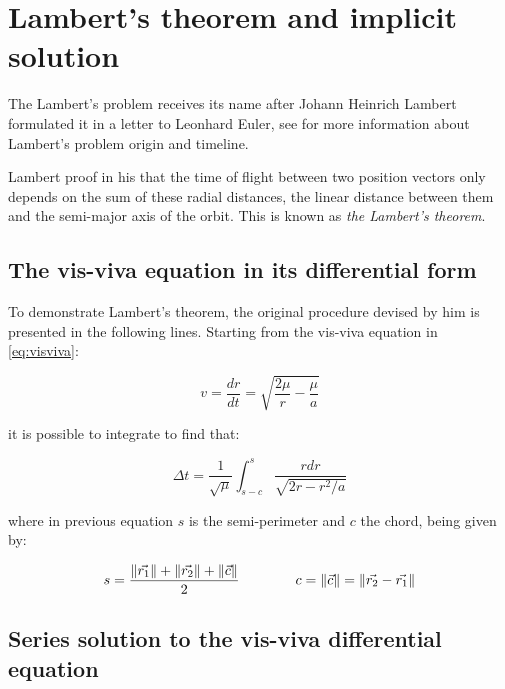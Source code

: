 \section{Lambert's theorem and implicit solution}
\label{sec:lamberts_theorem}

The Lambert's problem receives its name after Johann Heinrich Lambert formulated
it in a letter to Leonhard Euler, see \cite{albouy2019} for more information
about Lambert's problem origin and timeline.

Lambert proof in his  that the time of flight between two
position vectors only depends on the sum of these radial distances, the linear
distance between them and the semi-major axis of the orbit. This is known as
\textit{the Lambert's theorem}.

\subsection{The vis-viva equation in its differential form}

To demonstrate Lambert's theorem, the original procedure devised by him is
presented in the following lines. Starting from the vis-viva equation in
\ref{eq:visviva}:

\begin{equation}
  v = \frac{dr}{dt} = \sqrt{\frac{2\mu}{r} - \frac{\mu}{a}}
  \label{eq:visviva}
\end{equation}

it is possible to integrate to find that:

\begin{equation}
  \Delta t = \frac{1}{\sqrt{\mu}} \int_{s-c}^{s} \frac{r dr}{\sqrt{2r -
      r^{2}/a}}
  \label{eq:visviva_integral}
\end{equation}

where in previous equation $s$ is the semi-perimeter and $c$ the chord, being
given by:

\begin{equation}
  s = \frac{\lVert\vec{r_{1}}\rVert + \lVert\vec{r_{2}}\rVert +
    \lVert\vec{c}\rVert}{2}\quad\quad\quad\quad
  c = \lVert\vec{c}\rVert = \lVert\vec{r_{2}} - \vec{r_{1}}\rVert
  \label{eq:s_and_c_lambert}
\end{equation}

\subsection{Series solution to the vis-viva differential equation}


